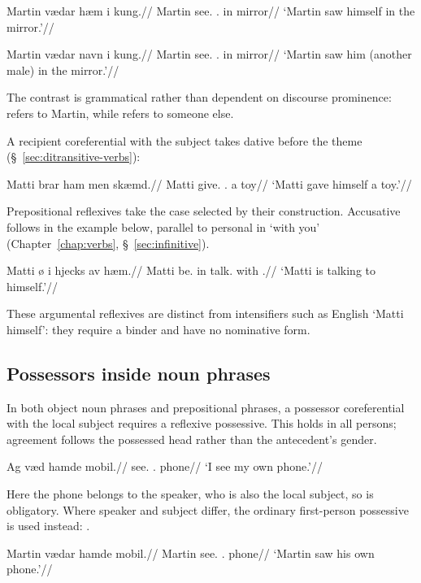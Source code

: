 \pex
\begingl
\gla Martin vædar hæm i kung.//
\glb Martin see.\Pst{} \Refl{}.\Acc{} in mirror//
\glft `Martin saw himself in the mirror.'//
\endgl
\xe

\pex
\begingl
\gla Martin vædar navn i kung.//
\glb Martin see.\Pst{} \Third{}\Sg{}.\Acc{} in mirror//
\glft `Martin saw him (another male) in the mirror.'//
\endgl
\xe

The contrast is grammatical rather than dependent on discourse prominence:  refers to Martin, while  refers to someone else.

A recipient coreferential with the subject takes dative  before the theme (\S~\ref{sec:ditransitive-verbs}):

\pex
\begingl
\gla Matti brar ham men skæmd.//
\glb Matti give.\Pst{} \Refl{}.\Dat{} a toy//
\glft `Matti gave himself a toy.'//
\endgl
\xe

Prepositional reflexives take the case selected by their construction. Accusative  follows  in the example below, parallel to personal  in  `with you' (Chapter~\ref{chap:verbs}, \S~\ref{sec:infinitive}).

\pex
\begingl
\gla Matti ø i hjecks av hæm.//
\glb Matti be.\Pres{} in talk.\Inf{} with \Refl{}.\Acc{}//
\glft `Matti is talking to himself.'//
\endgl
\xe

These argumental reflexives are distinct from intensifiers such as English `Matti himself': they require a binder and have no nominative form.

\subsection{Possessors inside noun phrases}
\label{sec:possessive-binding}

In both object noun phrases and prepositional phrases, a possessor coreferential with the local subject requires a reflexive possessive. This holds in all persons; agreement follows the possessed head rather than the antecedent's gender.

\pex
\begingl
\gla Ag væd hamde mobil.//
\glb \First{}\Sg{} see.\Pres{} \Refl{}.\M{} phone//
\glft `I see my own phone.'//
\endgl
\xe

Here the phone belongs to the speaker, who is also the local subject, so  is obligatory. Where speaker and subject differ, the ordinary first-person possessive is used instead: .

\pex
\begingl
\gla Martin vædar hamde mobil.//
\glb Martin see.\Pst{} \Refl{}.\M{} phone//
\glft `Martin saw his own phone.'//
\endgl
\xe

